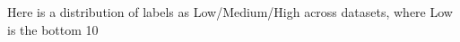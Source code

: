 \documentclass[preview]{standalone}
\begin{document}
Here is a distribution of labels as Low/Medium/High across datasets, where Low is the bottom 10%
\end{document}
